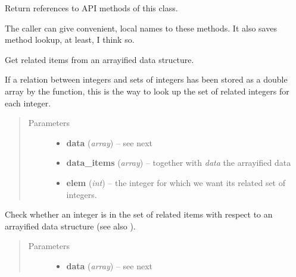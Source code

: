 \documentclass[letterpaper,10pt,english]{sphinxmanual}
\begin{document}
\begin{fulllineitems}
\begin{fulllineitems}
\label{graf/graf:graf.GrafTask.get_mappings}
Return references to API methods of this class.

The caller can give convenient, local names to these methods.
It also saves method lookup,
at least, I think so.

\end{fulllineitems}


\begin{fulllineitems}
\label{graf/graf:graf.GrafTask.getitems}
Get related items from an arrayified data structure.

If a relation between integers and sets of integers has been stored as a double array
by the {\hyperref[graf/graf:graf.model.arrayify]{}} function,
this is the way to look up the set of related integers for each integer.
\begin{quote}\begin{description}
\item[{Parameters}] \leavevmode\begin{itemize}
\item {} 
\textbf{data} (\emph{array}) --
see next

\item {} 
\textbf{data\_items} (\emph{array}) --
together with \emph{data} the arrayified data

\item {} 
\textbf{elem} (\emph{int}) --
the integer for which we want its related set of integers.

\end{itemize}

\end{description}\end{quote}

\end{fulllineitems}


\begin{fulllineitems}
\label{graf/graf:graf.GrafTask.hasitem}
Check whether an integer is in the set of related items
with respect to an arrayified data structure (see also {\hyperref[graf/graf:graf.GrafTask.getitems]{}}).
\begin{quote}\begin{description}
\item[{Parameters}] \leavevmode\begin{itemize}
\item {} 
\textbf{data} (\emph{array}) --
see next


\end{itemize}
\end{description}
\end{quote}
\end{fulllineitems}
\end{fulllineitems}
\end{document}

